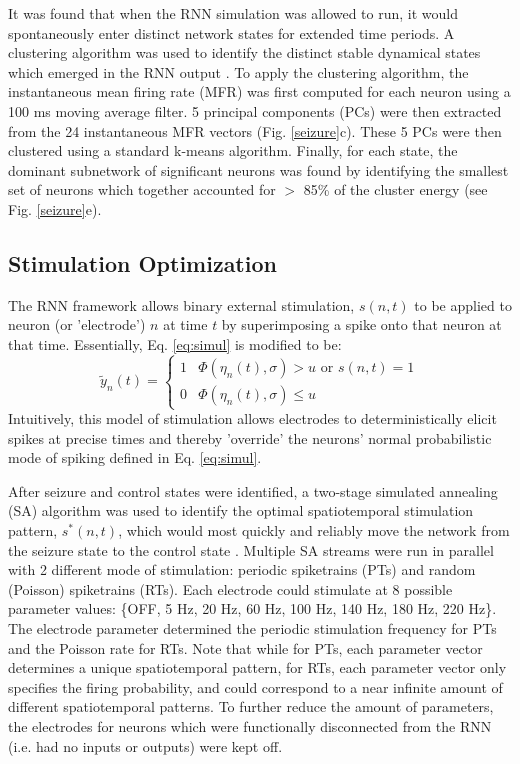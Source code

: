 \documentclass[journal,twoside,web]{ieeecolor}
\newcommand{\nn}{24}    %
\begin{document}
It was found that when the RNN simulation was allowed to run, it would spontaneously enter distinct network states for extended time periods.
A clustering algorithm was used to identify the distinct stable dynamical states which emerged in the RNN output \cite{sasaki07,santaniello14}.
To apply the clustering algorithm, the instantaneous mean firing rate (MFR) was first computed for each neuron using a 100 ms moving average filter.
5 principal components (PCs) were then extracted from the \nn{} instantaneous MFR vectors (Fig. \ref{seizure}c).
These 5 PCs were then clustered using a standard k-means algorithm.
Finally, for each state, the dominant subnetwork of significant neurons was found by identifying the smallest set of neurons which together accounted for $>$ 85\% of the cluster energy (see Fig. \ref{seizure}e).

\subsection{Stimulation Optimization}
The RNN framework allows binary external stimulation, $s(n,t)$ to be applied to neuron (or 'electrode') $n$ at time $t$ by superimposing a spike onto that neuron at that time.
Essentially, Eq. \ref{eq:simul} is modified to be:
\begin{equation}
\tilde{y}_n(t) =
\begin{cases}
1   & \Phi(\eta_n(t),\sigma) > u \text{ or } s(n,t)=1 \\
0   & \Phi(\eta_n(t),\sigma) \leq u
\end{cases}
\label{eq:stim}
\end{equation}
Intuitively, this model of stimulation allows electrodes to deterministically elicit spikes at precise times and thereby 'override' the neurons' normal probabilistic mode of spiking defined in Eq. \ref{eq:simul}. 

After seizure and control states were identified, a two-stage simulated annealing (SA) algorithm was used to identify the optimal spatiotemporal stimulation pattern, $s^*(n,t)$, which would most quickly and reliably move the network from the seizure state to the control state \cite{kirkpatrick83}.
Multiple SA streams were run in parallel with 2 different mode of stimulation: periodic spiketrains (PTs) and random (Poisson) spiketrains (RTs).
Each electrode could stimulate at 8 possible parameter values: \{OFF, 5 Hz, 20 Hz, 60 Hz, 100 Hz, 140 Hz, 180 Hz, 220 Hz\}.
The electrode parameter determined the periodic stimulation frequency for PTs and the Poisson rate for RTs.
Note that while for PTs, each parameter vector determines a unique spatiotemporal pattern, for RTs, each parameter vector only specifies the firing probability, and could correspond to a near infinite amount of different spatiotemporal patterns.
To further reduce the amount of parameters, the electrodes for neurons which were functionally disconnected from the RNN (i.e. had no inputs or outputs) were kept off.
\end{document}

